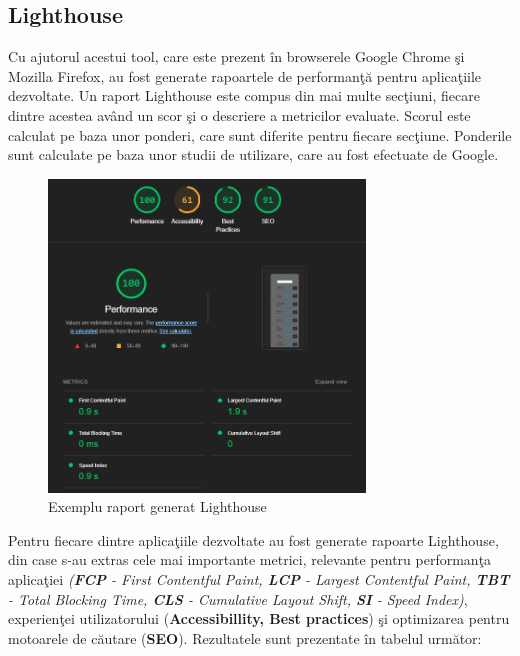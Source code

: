 \documentclass[12pt, a4paper]{report}
\begin{document}
\subsection{Lighthouse}

Cu ajutorul acestui tool, care este prezent \^in browserele Google Chrome \c si Mozilla Firefox, au fost generate rapoartele de performan\c t\u a pentru aplica\c tiile dezvoltate. Un raport Lighthouse este compus din mai multe sec\c tiuni, fiecare dintre acestea av\^and un scor \c si o descriere a metricilor evaluate. Scorul este calculat pe baza unor ponderi, care sunt diferite pentru fiecare sec\c tiune. Ponderile sunt calculate pe baza unor studii de utilizare, care au fost efectuate de Google.

\begin{figure}[htbp]
	\centering
	\includegraphics[width=0.75\textwidth]{01_mobile_lighthouse.png}
	\caption{Exemplu raport generat Lighthouse}
	\label{fig:lighthouse-example}
\end{figure}

Pentru fiecare dintre aplica\c tiile dezvoltate au fost generate rapoarte Lighthouse, din case s-au extras cele mai importante metrici, relevante pentru performan\c ta aplica\c tiei \textit{(\textbf{FCP} - First Contentful Paint, \textbf{LCP} - Largest Contentful Paint, \textbf{TBT} - Total Blocking Time, \textbf{CLS} - Cumulative Layout Shift, \textbf{SI} - Speed Index)}, experien\c tei utilizatorului (\textbf{Accessibillity, Best practices}) \c si optimizarea pentru motoarele de c\u autare (\textbf{SEO}). Rezultatele sunt prezentate \^in tabelul urm\u ator:
\end{document}
